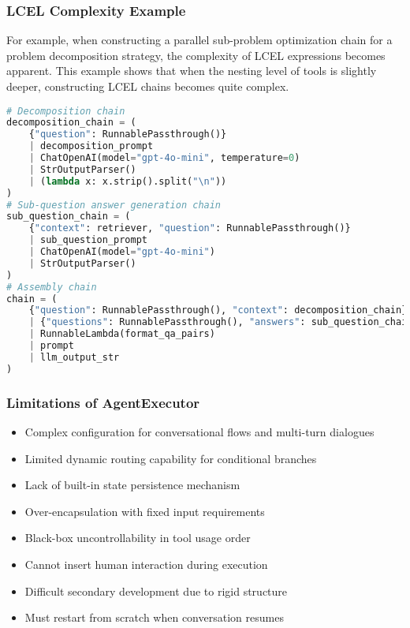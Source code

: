\begin{frame}[fragile]\frametitle{LCEL Complexity Example}

For example, when constructing a parallel sub-problem optimization chain for a problem decomposition strategy, the complexity of LCEL expressions becomes apparent. This example shows that when the nesting level of tools is slightly deeper, constructing LCEL chains becomes quite complex.

\begin{lstlisting}[language=Python, basicstyle=\tiny]
# Decomposition chain
decomposition_chain = (
    {"question": RunnablePassthrough()}
    | decomposition_prompt
    | ChatOpenAI(model="gpt-4o-mini", temperature=0)
    | StrOutputParser()
    | (lambda x: x.strip().split("\n"))
)
# Sub-question answer generation chain
sub_question_chain = (
    {"context": retriever, "question": RunnablePassthrough()}
    | sub_question_prompt
    | ChatOpenAI(model="gpt-4o-mini")
    | StrOutputParser()
)
# Assembly chain
chain = (
    {"question": RunnablePassthrough(), "context": decomposition_chain}
    | {"questions": RunnablePassthrough(), "answers": sub_question_chain.map()}
    | RunnableLambda(format_qa_pairs)
    | prompt
    | llm_output_str
)
      \end{lstlisting}
\end{frame}

\begin{frame}[fragile]\frametitle{Limitations of AgentExecutor}
      \begin{itemize}
        \item Complex configuration for conversational flows and multi-turn dialogues
        \item Limited dynamic routing capability for conditional branches
        \item Lack of built-in state persistence mechanism
        \item Over-encapsulation with fixed input requirements
        \item Black-box uncontrollability in tool usage order
        \item Cannot insert human interaction during execution
        \item Difficult secondary development due to rigid structure
        \item Must restart from scratch when conversation resumes
      \end{itemize}
\end{frame}


